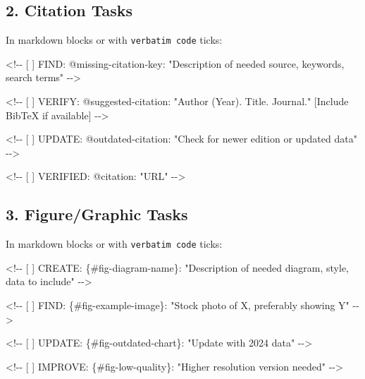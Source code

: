 \documentclass[
  11pt,
  letterpaper,
]{book}
\newenvironment{Shaded}{\begin{snugshade}}{\end{snugshade}}
\newcommand{\CommentTok}[1]{\textcolor[rgb]{0.37,0.37,0.37}{#1}}
\newcommand{\InformationTok}[1]{\textcolor[rgb]{0.37,0.37,0.37}{#1}}
\begin{document}
\subsection*{2. Citation Tasks}\label{citation-tasks}

In markdown blocks or with \texttt{verbatim\ code} ticks:

\begin{Shaded}
\begin{Highlighting}[]
\InformationTok{\textasciigrave{}\textless{}!{-}{-} [ ] FIND: @missing{-}citation{-}key: "Description of needed source, keywords, search terms" {-}{-}\textgreater{}\textasciigrave{}}

\InformationTok{\textasciigrave{}\textless{}!{-}{-} [ ] VERIFY: @suggested{-}citation: "Author (Year). Title. Journal." [Include BibTeX if available] {-}{-}\textgreater{}\textasciigrave{}}

\InformationTok{\textasciigrave{}\textless{}!{-}{-} [ ] UPDATE: @outdated{-}citation: "Check for newer edition or updated data" {-}{-}\textgreater{}\textasciigrave{}}

\InformationTok{\textasciigrave{}\textless{}!{-}{-} [ ] VERIFIED: @citation: "URL" {-}{-}\textgreater{}\textasciigrave{}}
\end{Highlighting}
\end{Shaded}

\subsection*{3. Figure/Graphic Tasks}\label{figuregraphic-tasks}

In markdown blocks or with \texttt{verbatim\ code} ticks:

\begin{Shaded}
\begin{Highlighting}[]
\CommentTok{\textless{}!{-}{-} [ ] CREATE: \{\#fig{-}diagram{-}name\}: "Description of needed diagram, style, data to include" {-}{-}\textgreater{}}

\CommentTok{\textless{}!{-}{-} [ ] FIND: \{\#fig{-}example{-}image\}: "Stock photo of X, preferably showing Y" {-}{-}\textgreater{}}

\CommentTok{\textless{}!{-}{-} [ ] UPDATE: \{\#fig{-}outdated{-}chart\}: "Update with 2024 data" {-}{-}\textgreater{}}

\CommentTok{\textless{}!{-}{-} [ ] IMPROVE: \{\#fig{-}low{-}quality\}: "Higher resolution version needed" {-}{-}\textgreater{}}
\end{Highlighting}
\end{Shaded}
\end{document}
